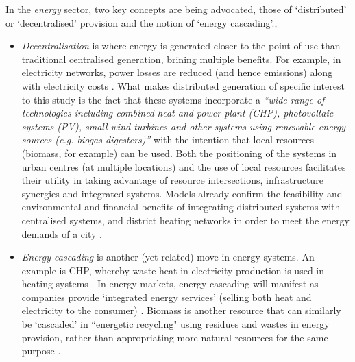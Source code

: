 In the \emph{energy} sector, two key concepts are being advocated, those of `distributed' or `decentralised' provision and the notion of `energy cascading'., 
\begin{itemize} 
	\item \emph{Decentralisation} is where energy is generated closer to the point of use than traditional centralised generation, brining multiple benefits. For example, in electricity networks, power losses are reduced (and hence emissions) along with electricity costs \citep{Fleten2007}. What makes distributed generation of specific interest to this study is the fact that these systems incorporate a \emph{``wide range of technologies including combined heat and power plant (CHP), photovoltaic systems (PV), small wind turbines and other systems using renewable energy sources (e.g. biogas digesters)''} \citep[p. 1001]{Ren2010} with the intention that local resources (biomass, for example) can be used. Both the positioning of the systems in urban centres (at multiple locations) and the use of local resources facilitates their utility in taking advantage of resource intersections, infrastructure synergies and integrated systems. Models already confirm the feasibility and environmental and financial benefits of integrating distributed systems with centralised systems, and district heating networks in order to meet the energy demands of a city \citep{Weber2011}. 
	\item \emph{Energy cascading} is another (yet related) move in energy systems. An example is CHP, whereby waste heat in electricity production is used in heating systems \citep{Grubler2009}. In energy markets, energy cascading will manifest as companies provide `integrated energy services' (selling both heat and electricity to the consumer) \citep{Sugihara2004}. Biomass is another resource that can similarly be `cascaded' in ``energetic recycling" using residues and wastes in energy provision, rather than appropriating more natural resources for the same purpose \citep{Haberl2001a}.
\end{itemize}

